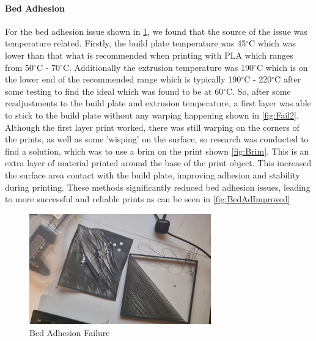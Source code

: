 \paragraph{Bed Adhesion}

For the bed adhesion issue shown in \ref{fig:Fail1}, we found that the source of the issue was temperature related. 
Firstly, the build plate temperature was 45$^{\circ}$C which was lower than that what is recommended when printing with PLA which ranges from 50$^{\circ}$C - 70$^{\circ}$C. 
Additionally the extrusion temperature was 190$^{\circ}$C which is on the lower end of the recommended range which is typically 190$^{\circ}$C - 220$^{\circ}$C \cite{RefWorks:RefID:91-unionfab2025ultimate} after some testing to find the ideal which was found to be at 60$^{\circ}$C.
So, after some readjustments to the build plate and extrusion temperature, a first layer was able to stick to the build plate without any warping happening shown in \ref{fig:Fail2}.
Although the first layer print worked, there was still warping on the corners of the prints, as well as some 'wisping' on the surface, so research was conducted to find a solution, which was to use a brim on the print shown \ref{fig:Brim}.
This is an extra layer of material printed around the base of the print object. 
This increased the surface area contact with the build plate, improving adhesion and stability during printing. 
These methods significantly reduced bed adhesion issues, leading to more successful and reliable prints as can be seen in \ref{fig:BedAdImproved}

\begin{figure}[htbp]
    \centering
    \includegraphics[width=0.7\textwidth]{figures/CAD-3DPrint/FAIL1.jpg}
    \caption{Bed Adhesion Failure}
    \label{fig:Fail1}
   
    
\end{figure}

